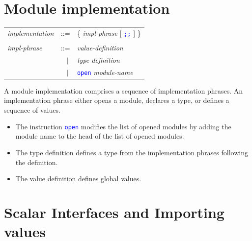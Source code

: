\documentclass[11pt,titlepage,twoside]{report}
\newcommand{\alt}{\;|\;}
\newcommand{\term}[1]{\textcolor{Blue}{\tt #1}}
\newcommand{\nterm}[1]{\textcolor{BrickRed}{\it #1}}
\newcommand{\term}[1]{{\tt #1}}
\newcommand{\nterm}[1]{{\em #1}}
\begin{document}
\section{Module implementation\label{moduleimpl}} %
\begin{center}
\begin{tabular}{lcl}
\nterm{implementation}
  & ::=        & \{ \nterm{impl-phrase} [ \term{;;} ] \} 
\\ \\
\nterm{impl-phrase}
  & ::=        & \nterm{value-definition} \\ 
  & $\;\;\alt$ & \nterm{type-definition} \\
  & $\;\;\alt$ & \term{open} \nterm{module-name} 
\end{tabular}
\end{center}
A module implementation comprises a sequence of implementation
phrases. An implementation phrase either opens a module, declares a type, or 
defines a sequence of values.
\begin{itemize}
\item
The instruction \term{open} modifies the list of opened modules by adding 
the module name to the head of the list of opened modules.

\item
The type definition defines a type from the implementation
phrases following the definition.

\item
The value definition defines global values.
\end{itemize}

\section{Scalar Interfaces and Importing values\label{importing}} %
\end{document}
